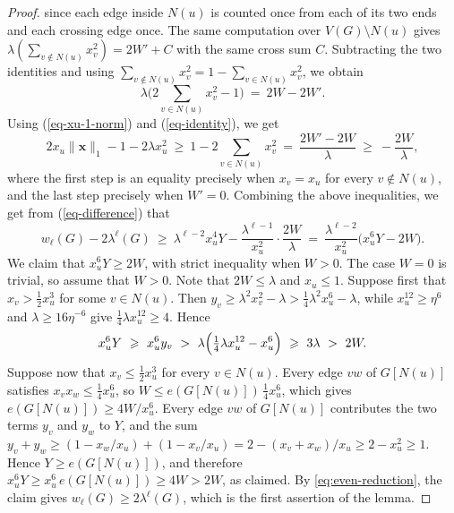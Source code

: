 \documentclass[11pt, a4paper]{article}
\theoremstyle{definition}
\theoremstyle{plain}
\renewcommand{\le}{\leqslant}
\renewcommand{\ge}{\geqslant}
\begin{document}
\begin{proof}
since each edge inside $N(u)$ is counted once from each of its two ends and each crossing edge once. The same computation
over $V(G)\setminus N(u)$ gives
$\lambda (\sum_{v\notin N(u)} x_v^2)=2W'+C$ with the same cross sum $C$. Subtracting
the two identities and using
$\sum_{v\notin N(u)} x_v^2 =1 - \sum_{v\in N(u)} x_v^2 $, we obtain
\begin{equation} \label{eq-identity}
\lambda \bigg(2\sum_{v\in N(u)} x_v^2 -1 \bigg) 
\ = \ 2W-2W'.
\end{equation}
Using (\ref{eq-xu-1-norm}) and (\ref{eq-identity}), we get 
\[
  2x_u\lVert \bm{x}\rVert_1-1-2\lambda x_u^{2}
  \ \ge\ 1-2 \sum_{v\in N(u)} x_v^2 \ =\ \frac{2W'-2W}{\lambda}
  \ \ge\ -\frac{2W}{\lambda},
\]
where the first step is an equality precisely when
$x_v=x_u$ for every $v\notin N(u)$, and the last step precisely
when $W'=0$. Combining the above inequalities, we get from (\ref{eq-difference}) that 
\begin{equation}\label{eq:even-reduction}
  w_\ell (G)-2\lambda^{\ell}(G)
  \ \ge\  \lambda^{\ell -2}x_u^{4}Y - \frac{\lambda^{\ell -1}}{x_u^{2}} \cdot \frac{2W}{\lambda} \ = \ 
  \frac{\lambda^{\ell -2}}{x_u^{2}}
         \bigl(x_u^{6}Y-2W\bigr).
\end{equation}
We claim that $x_u^{6}Y\ge 2W$, with strict inequality
when $W>0$. 
The case $W=0$ is trivial, so assume that
$W>0$. Note that $2W\le \lambda$
and $x_u\le 1$. Suppose first that
$x_v>\frac12x_u^{3}$ for some $v\in N(u)$. Then
$y_v\ge \lambda^2x_v^{2}-\lambda
>\frac14\lambda^{2}x_u^{6}-\lambda$, while
$x_u^{12}\ge \eta^{6}$ and $\lambda \ge 16\eta^{-6}$
give $\frac14\lambda x_u^{12}\ge 4$. Hence
\[
  x_u^{6}Y\ \ge\ x_u^{6}y_v
  \ >\ \lambda \Bigl(\tfrac14\lambda x_u^{12}
  -x_u^{6}\Bigr)
  \ \ge\ 3\lambda \ >\ 2W .
\]
Suppose now that $x_v\le \frac12x_u^{3}$ for every
$v\in N(u)$. Every edge $vw$ of $G[N(u)]$ satisfies
$x_vx_w\le \frac14x_u^{6}$, so $W\le e(G[N(u)]) \, \frac14x_u^{6}$, which gives 
$e(G[N(u)])\ge 4W/x_u^{6}$. 
Every edge $vw$ of $G[N(u)]$ contributes the two
terms $y_v$ and $y_w$ to $Y$, and the sum  
$y_v+y_w \ge (1-x_w/x_u) + (1-x_v/x_u)= 2- {(x_v+x_w)}/{x_u} \ge 2-x_u^{2} \ge 1 $. 
Hence $Y\ge e(G[N(u)])$, and therefore $x_u^{6}Y\ge x_u^{6}\, e(G[N(u)])\ge 4W>2W$, as claimed. 
By \eqref{eq:even-reduction}, the claim gives
$w_\ell (G)\ge 2\lambda^{\ell}(G)$, which is the first
assertion of the lemma. 


\end{proof}
\end{document}
